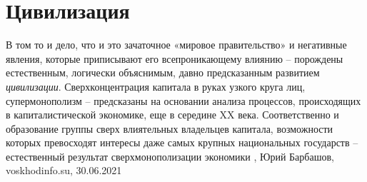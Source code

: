  
 
 
 
 
\chapter{Цивилизация}

В том то и дело, что и это зачаточное «мировое правительство» и негативные
явления, которые приписывают его всепроникающему влиянию – порождены
естественным, логически объяснимым, давно предсказанным развитием \emph{цивилизации}.
Сверхконцентрация капитала в руках узкого круга лиц, супермонополизм –
предсказаны на основании анализа процессов, происходящих в капиталистической
экономике, еще в середине XX века. Соответственно и образование группы сверх
влиятельных владельцев капитала, возможности которых превосходят интересы даже
самых крупных национальных государств – естественный результат
сверхмонополизации экономики
, 
Юрий Барбашов, voskhodinfo.su, 30.06.2021

